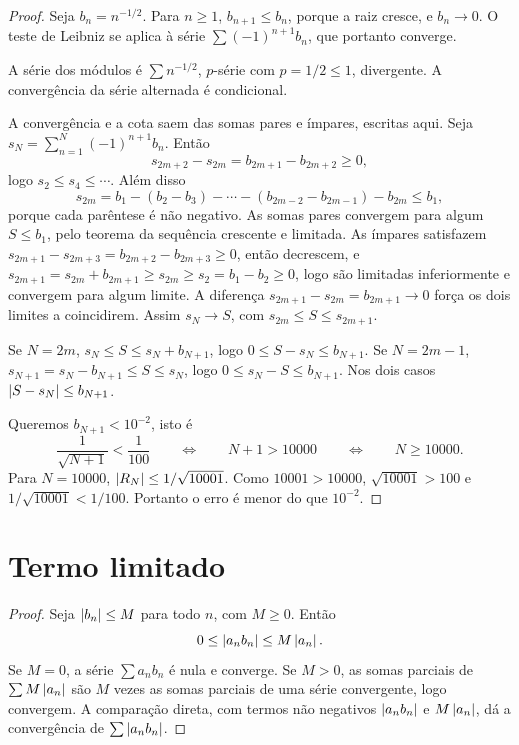 \documentclass[11pt,a4paper]{article}
\begin{document}
\begin{proof}
Seja \(b_n=n^{-1/2}\). Para \(n\ge 1\), \(b_{n+1}\le b_n\), porque a raiz cresce, e \(b_n\to 0\). O teste de Leibniz se aplica à série \(\sum (-1)^{n+1}b_n\), que portanto converge.

A série dos módulos é \(\sum n^{-1/2}\), \(p\)-série com \(p=1/2\le 1\), divergente. A convergência da série alternada é condicional.

A convergência e a cota saem das somas pares e ímpares, escritas aqui. Seja \(s_N=\sum_{n=1}^N (-1)^{n+1}b_n\). Então
\[
s_{2m+2}-s_{2m}=b_{2m+1}-b_{2m+2}\ge 0,
\]
logo \(s_2\le s_4\le\cdots\). Além disso
\[
s_{2m}=b_1-(b_2-b_3)-\cdots-(b_{2m-2}-b_{2m-1})-b_{2m}\le b_1,
\]
porque cada parêntese é não negativo. As somas pares convergem para algum \(S\le b_1\), pelo teorema da sequência crescente e limitada. As ímpares satisfazem \(s_{2m+1}-s_{2m+3}=b_{2m+2}-b_{2m+3}\ge 0\), então decrescem, e \(s_{2m+1}=s_{2m}+b_{2m+1}\ge s_{2m}\ge s_2=b_1-b_2\ge 0\), logo são limitadas inferiormente e convergem para algum limite. A diferença \(s_{2m+1}-s_{2m}=b_{2m+1}\to 0\) força os dois limites a coincidirem. Assim \(s_N\to S\), com \(s_{2m}\le S\le s_{2m+1}\).

Se \(N=2m\), \(s_N\le S\le s_N+b_{N+1}\), logo \(0\le S-s_N\le b_{N+1}\). Se \(N=2m-1\), \(s_{N+1}=s_N-b_{N+1}\le S\le s_N\), logo \(0\le s_N-S\le b_{N+1}\). Nos dois casos \(\left\lvert S-s_N \right\rvert\le b_{N+1}\).

Queremos \(b_{N+1}<10^{-2}\), isto é
\[
\frac{1}{\sqrt{N+1}}<\frac{1}{100}
\qquad\Leftrightarrow\qquad N+1>10000
\qquad\Leftrightarrow\qquad N\ge 10000.
\]
Para \(N=10000\), \(\left\lvert R_N \right\rvert\le 1/\sqrt{10001}\). Como \(10001>10000\), \(\sqrt{10001}>100\) e \(1/\sqrt{10001}<1/100\). Portanto o erro é menor do que \(10^{-2}\).
\end{proof}

\section{Termo limitado}

\begin{proof}
Seja \(\left\lvert b_n \right\rvert\le M\) para todo \(n\), com \(M\ge 0\). Então
\[
0\le\left\lvert a_nb_n \right\rvert\le M\left\lvert a_n \right\rvert.
\]
Se \(M=0\), a série \(\sum a_nb_n\) é nula e converge. Se \(M>0\), as somas parciais de \(\sum M\left\lvert a_n \right\rvert\) são \(M\) vezes as somas parciais de uma série convergente, logo convergem. A comparação direta, com termos não negativos \(\left\lvert a_nb_n \right\rvert\) e \(M\left\lvert a_n \right\rvert\), dá a convergência de \(\sum\left\lvert a_nb_n \right\rvert\).
\end{proof}
\end{document}
